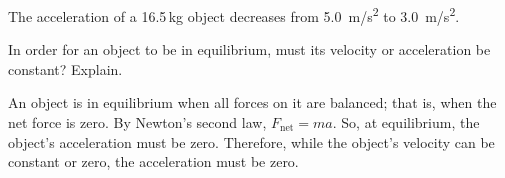 \documentclass[]{exam}
\begin{document}
\begin{questions}
\question
The acceleration of a 16.5\,kg object decreases from \SI{5.0}{m/s^2} to \SI{3.0}{m/s^2}.


\question
In order for an object to be in equilibrium, must its velocity or acceleration be constant? Explain.

\begin{solution}
An object is in equilibrium when all forces on it are balanced; that is, when the net force is zero. By Newton's second law, $F_\mathrm{net} = ma$. So, at equilibrium, the object's acceleration must be zero. Therefore, while the object's velocity can be constant or zero, the acceleration must be zero.
\end{solution}


\end{questions}
\end{document}
